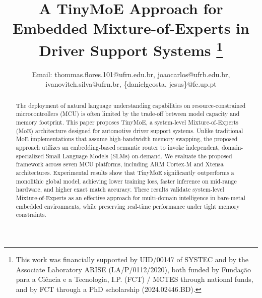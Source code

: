 \documentclass[conference]{IEEEtran}
\begin{document}
\title{
A TinyMoE Approach for Embedded Mixture-of-Experts in Driver Support Systems
\thanks{This work was financially supported by UID/00147 of SYSTEC and by the Associate Laboratory ARISE (LA/P/0112/2020), both funded by Fundação para a Ciência e a Tecnologia, I.P. (FCT) / MCTES through national funds, and by FCT through a PhD scholarship (2024.02446.BD).}
}


\author{
%
%
%
%



Email: thommas.flores.101@ufrn.edu.br, joaocarlos@ufrb.edu.br, ivanovitch.silva@ufrn.br, \{danielgcosta, jesus\}@fe.up.pt}

\maketitle

\begin{abstract}
The deployment of natural language understanding capabilities on resource-constrained microcontrollers (MCU) is often limited by the trade-off between model capacity and memory footprint. This paper proposes TinyMoE, a system-level Mixture-of-Experts (MoE) architecture designed for automotive driver support systems. Unlike traditional MoE implementations that assume high-bandwidth memory swapping, the proposed approach utilizes an embedding-based semantic router to invoke independent, domain-specialized Small Language Models (SLMs) on-demand. We evaluate the proposed framework across seven MCU platforms, including ARM Cortex-M and Xtensa architectures. Experimental results show that TinyMoE significantly outperforms a monolithic global model, achieving lower training loss, faster inference on mid-range hardware, and higher exact match accuracy. These results validate system-level Mixture-of-Experts as an effective approach for multi-domain intelligence in bare-metal embedded environments, while preserving real-time performance under tight memory constraints. 
\end{abstract}
\end{document}
